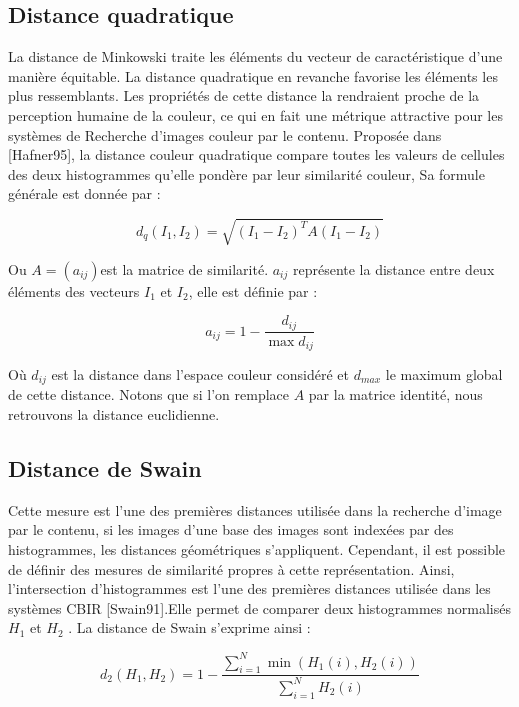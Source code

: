 \subsection{Distance quadratique}
La distance de Minkowski traite les éléments du vecteur de caractéristique d’une manière équitable. La distance quadratique en revanche favorise les éléments les plus ressemblants. Les propriétés de cette distance la rendraient proche de la perception humaine de la couleur, ce qui en fait une métrique attractive pour les systèmes de Recherche d’images couleur par le contenu. Proposée dans [Hafner95], la distance couleur quadratique compare toutes les valeurs
de cellules des deux histogrammes qu’elle pondère par leur similarité couleur, Sa formule générale est donnée par :

	\begin{equation}
	d_q(I_1, I_2) = \sqrt{(I_1 - I_2)^T A (I_1 - I_2)} 
	\end{equation}



Ou $A = (a_{ij}) $est la matrice de similarité. $a_{ij}$ représente la distance entre deux éléments des vecteurs $I_1$ et $I_2$, elle est définie par :


\begin{equation}
	a_{ij} = 1 - \frac{d_{ij}}{\max d_{ij}} 
\end{equation}

Où $ d_{ij} $ est la distance dans l’espace couleur considéré et $ d_{max} $ le maximum global
de cette distance. Notons que si l’on remplace $  A $ par la matrice identité, nous retrouvons la distance euclidienne.
\subsection{Distance de Swain}
Cette mesure est l'une des premières distances utilisée dans la recherche d'image par le contenu, si les images d’une base des images sont indexées par des histogrammes, les distances géométriques s’appliquent. Cependant, il est possible de définir des mesures de similarité propres à cette représentation. Ainsi, l’intersection d’histogrammes est l’une des premières distances utilisée dans les systèmes CBIR [Swain91].Elle permet de comparer deux histogrammes normalisés $H_1$ et $H_2$ . La distance de Swain s’exprime ainsi :

	\begin{equation}
	 d_2(H_1, H_2) = 1- \frac{\sum_{i=1}^{N} \min(H_1(i),  H_2(i))}{\sum_{i=1}^{N}  H_2(i)}  
	\end{equation}

